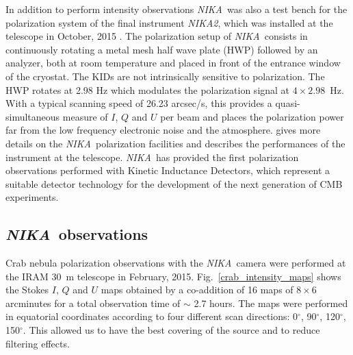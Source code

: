 \documentclass[twocolumn,traditabstract]{aa}
\def\NIKA{\textit{NIKA}}
\def\NIKAd{\textit{NIKA2}}
\begin{document}
In addition to perform intensity observations \NIKA\ was also a test bench for
the polarization system of the final instrument \NIKAd, which was installed at
the telescope in October, 2015 \citep{calvo2016,2016arXiv160508628C}. The
polarization setup of \NIKA\ consists in continuously rotating a metal mesh half
wave plate (HWP) followed by an analyzer, both at room temperature and
  placed in front of the entrance window of the cryostat. The KIDs are not
  intrinsically sensitive to polarization. The HWP rotates at 2.98 Hz which
  modulates the polarization signal at $4\times 2.98$~Hz. With a typical scanning
  speed of 26.23 arcsec/s, this provides a quasi-simultaneous measure of $I$,
  $Q$ and $U$ per beam and places the polarization power far from the low
  frequency electronic noise and the atmosphere. \cite{ritacco2017} gives more
details on the \NIKA\ polarization facilities and describes the performances of
the instrument at the telescope.  \NIKA\ has provided the first polarization
observations performed with Kinetic Inductance Detectors, which represent a
suitable detector technology for the development of the next generation of CMB
experiments.

\subsection{\NIKA\ observations}\label{sec:nika_observations}
Crab nebula polarization observations with the \NIKA\ camera were performed at
the IRAM 30~m telescope in February, 2015. Fig.~\ref{crab_intensity_maps} shows
the Stokes $I$, $Q$ and $U$ maps obtained by a co-addition of 16 maps
of $8 \times 6$ arcminutes for a total observation time of $\sim$ 2.7 hours. The
maps were performed in equatorial coordinates according to four different scan
directions: 0$^{\circ}$, 90$^{\circ}$, 120$^{\circ}$, 150$^{\circ}$. This
allowed us to have the best covering of the source and to reduce filtering
effects.
\end{document}
